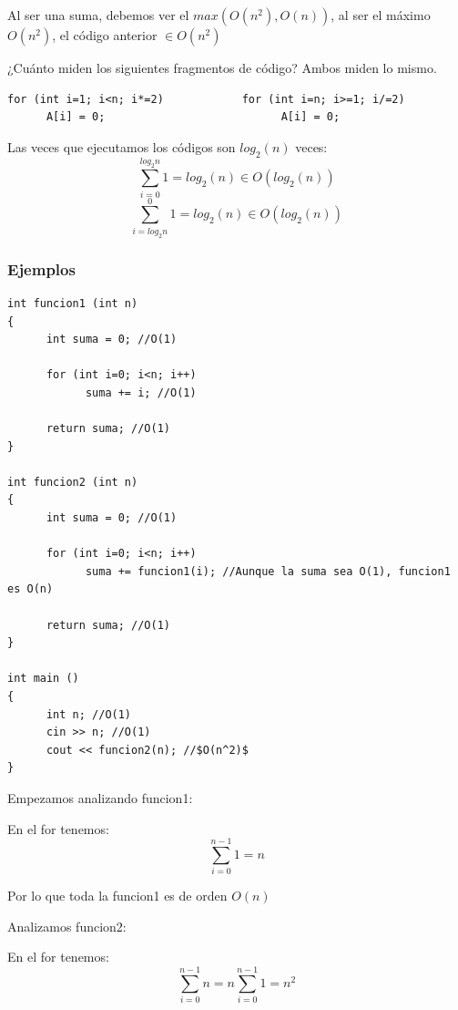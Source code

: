 \documentclass[10pt,a4paper,spanish]{report}
\begin{document}
\noindent
Al ser una suma, debemos ver el $max(O(n^{2}), O(n))$, al ser el máximo $O(n^{2})$, el código anterior $\in O(n^{2})$

\noindent
¿Cuánto miden los siguientes fragmentos de código? Ambos miden lo mismo.
\begin{verbatim}
for (int i=1; i<n; i*=2)            for (int i=n; i>=1; i/=2)
      A[i] = 0;                           A[i] = 0;
\end{verbatim}

\noindent
Las veces que ejecutamos los códigos son $log_{2}(n)$ veces:
\begin{displaymath}
\sum_{i=0}^{log_{2}n}1= log_{2}(n) \in O(log_{2}(n))
\end{displaymath}
\begin{displaymath}
\sum_{i=log_{2}n}^{0}1= log_{2}(n) \in O(log_{2}(n))
\end{displaymath}

\subsubsection{\textcolor[rgb]{0.1,0.2,0.6}Ejemplos}

\begin{verbatim}
int funcion1 (int n)
{
      int suma = 0; //O(1)

      for (int i=0; i<n; i++)
            suma += i; //O(1)

      return suma; //O(1)
}

int funcion2 (int n)
{
      int suma = 0; //O(1)

      for (int i=0; i<n; i++)
            suma += funcion1(i); //Aunque la suma sea O(1), funcion1 es O(n)

      return suma; //O(1)
}

int main ()
{
      int n; //O(1)
      cin >> n; //O(1)
      cout << funcion2(n); //$O(n^2)$
}
\end{verbatim}

\noindent
Empezamos analizando funcion1:

\noindent
En el for tenemos:
\begin{displaymath}
\sum_{i=0}^{n-1} 1 = n
\end{displaymath}

\noindent
Por lo que toda la funcion1 es de orden $O(n)$

\noindent
Analizamos funcion2:

\noindent
En el for tenemos:
\begin{displaymath}
\sum_{i=0}^{n-1} n = n \sum_{i=0}^{n-1} 1 = n^{2}
\end{displaymath}
\end{document}
